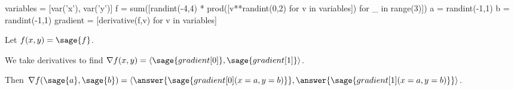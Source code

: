 \documentclass{ximera}
\author{Jim Fowler}
\begin{document}
\makerandom

\begin{sagesilent}
  variables = [var('x'), var('y')]
  f = sum([randint(-4,4) * prod([v**randint(0,2) for v in variables]) for _ in range(3)])
  a = randint(-1,1)
  b = randint(-1,1)
  gradient = [derivative(f,v) for v in variables]
\end{sagesilent}

\begin{exercise}

  Let $f(x,y) = \sage{f}$.

  \begin{hint}
    We take derivatives to find $\nabla f(x,y) = \langle \sage{gradient[0]}, \sage{gradient[1]} \rangle$.
  \end{hint}  
  
  Then $\nabla f(\sage{a},\sage{b}) = \langle \answer{\sage{gradient[0](x=a,y=b)}}, \answer{\sage{gradient[1](x=a,y=b)}} \rangle$.

\end{exercise}
\end{document}
